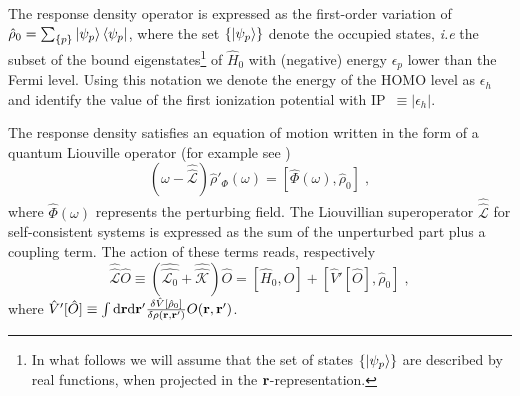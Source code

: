 \documentclass[reprint,aps,prb]{revtex4-1}
\newcommand{\dd}{{\rm d}}
\renewcommand{\r}{{\bf r}}
\newcommand{\eps}{\epsilon}
\newcommand{\be}{\begin{equation}}
\newcommand{\ee}{\end{equation}}
\newcommand{\lb}{\label}
\newcommand{\op}[1]{\hat {#1}}
\newcommand{\sop}[1]{\op{\op {#1}}}
\newcommand{\commutator}[2]{\left[ {#1} , {#2} \right]}
\newcommand{\dmnot}{\op{\rho}_0}
\newcommand{\dm}{\op{\rho}}
\newcommand{\hnot}{\op{H}_0}
\newcommand{\Liouv}{\sop{\mathcal L}}
\newcommand{\Liouvnot}{\sop{\mathcal L_0}}
\newcommand{\coupl}{\sop{\mathcal K}}
\begin{document}
\label{FluctuationState}

The response density operator is expressed as the first-order variation of $\dmnot=\sum_{\{p\}} \ket{\psi_p} \bra{\psi_p}$, where the set $\{\ket{\psi_p}\}$ denote the 
occupied states, \emph{i.e} the subset of the bound eigenstates\footnote{In what follows we will assume that the set of states $\{\ket{\psi_p}\}$ are described by real 
functions, when projected in the $\r$-representation.} of $\hnot$ with (negative) energy $\eps_p$ lower than the Fermi level. Using this notation we denote the energy of the HOMO level 
as $\eps_h$ and identify the value of the first ionization potential with IP~$\equiv|\eps_h|$. 

The response density satisfies an equation of motion written in the form of a quantum Liouville operator (for example see \cite{baroni2008})
\be\lb{LiouvillianRhopomegaDef1}
\left(\omega - \Liouv\right) \dm'_\Phi(\omega) =  \commutator{\op\Phi(\omega)}{\dmnot} \;,
\ee
where $\op\Phi(\omega)$ represents the perturbing field. 
The Liouvillian superoperator $\Liouv$ for self-consistent systems is expressed as the sum of the unperturbed part plus a coupling term. The action of these 
terms reads, respectively
\be\lb{LiouZeroDef1}
\Liouv \op O \equiv \left(\Liouvnot + \coupl \right) \op O = \commutator{\hnot}{\op O} +\commutator{\op V'[\op O]}{\dmnot}  \;,
\ee
where $\op V'[\op O] \equiv \int \dd \r \dd \r'\frac{\delta \op V[\dmnot]}{\delta \rho(\r,\r')} O(\r,\r')$.
\end{document}
